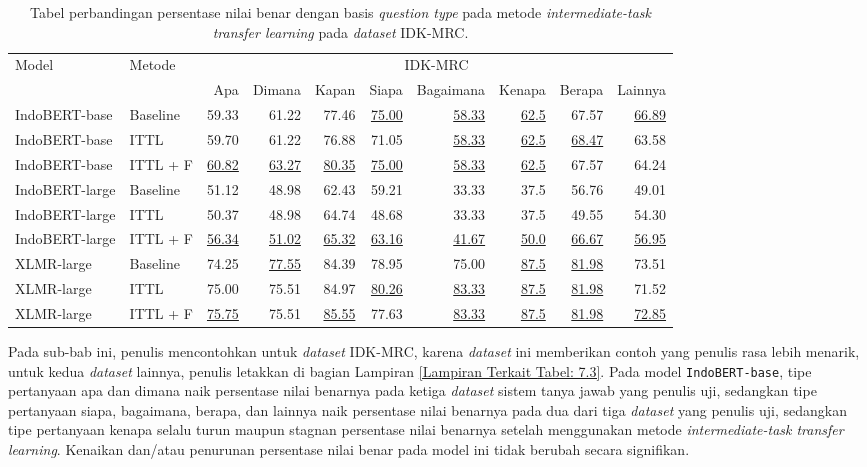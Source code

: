 \begin{table}[H]\centering
\scriptsize
\begin{tabular}{llrrrrrrrr}
\toprule
         \multirow{2}{*}{Model} &\multirow{2}{*}{Metode} &\multicolumn{8}{c}{IDK-MRC} \\\cmidrule{3-10}
& &Apa &Dimana &Kapan &Siapa &Bagaimana &Kenapa &Berapa &Lainnya \\\midrule
IndoBERT-base &Baseline &59.33 &61.22 &77.46 &\underline{75.00} &\underline{58.33} &\underline{62.5} &67.57 &\underline{66.89} \\
IndoBERT-base &ITTL &59.70 &61.22 &76.88 &71.05 &\underline{58.33} &\underline{62.5} &\underline{68.47} &63.58 \\
IndoBERT-base &ITTL + F &\underline{60.82} &\underline{63.27} &\underline{80.35} &\underline{75.00} &\underline{58.33} &\underline{62.5} &67.57 &64.24 \\
\hline
IndoBERT-large &Baseline &51.12 &48.98 &62.43 &59.21 &33.33 &37.5 &56.76 &49.01 \\
IndoBERT-large &ITTL &50.37 &48.98 &64.74 &48.68 &33.33 &37.5 &49.55 &54.30 \\
IndoBERT-large &ITTL + F &\underline{56.34} &\underline{51.02} &\underline{65.32} &\underline{63.16} &\underline{41.67} &\underline{50.0} &\underline{66.67} &\underline{56.95} \\
\hline
XLMR-large &Baseline &74.25 &\underline{77.55} &84.39 &78.95 &75.00 &\underline{87.5} &\underline{81.98} &73.51 \\
XLMR-large &ITTL &75.00 &75.51 &84.97 &\underline{80.26} &\underline{83.33} &\underline{87.5} &\underline{81.98} &71.52 \\
XLMR-large &ITTL + F &\underline{75.75} &75.51 &\underline{85.55} &77.63 &\underline{83.33} &\underline{87.5} &\underline{81.98} &\underline{72.85} \\
\bottomrule
\end{tabular}
\caption{Tabel perbandingan persentase nilai benar dengan basis \emph{question type} pada metode \emph{intermediate-task transfer learning} pada \emph{dataset} IDK-MRC.}
\end{table}

Pada sub-bab ini, penulis mencontohkan untuk \emph{dataset} IDK-MRC, karena \emph{dataset} ini memberikan contoh yang penulis rasa lebih menarik, untuk kedua \emph{dataset} lainnya, penulis letakkan di bagian Lampiran \ref{Lampiran Terkait Tabel: 7.3}. Pada model \texttt{IndoBERT-base}, tipe pertanyaan apa dan dimana naik persentase nilai benarnya pada ketiga \emph{dataset} sistem tanya jawab yang penulis uji, sedangkan tipe pertanyaan siapa, bagaimana, berapa, dan lainnya naik persentase nilai benarnya pada dua dari tiga \emph{dataset} yang penulis uji, sedangkan tipe pertanyaan kenapa selalu turun maupun stagnan persentase nilai benarnya setelah menggunakan metode \emph{intermediate-task transfer learning}. Kenaikan dan/atau penurunan persentase nilai benar pada model ini tidak berubah secara signifikan.

